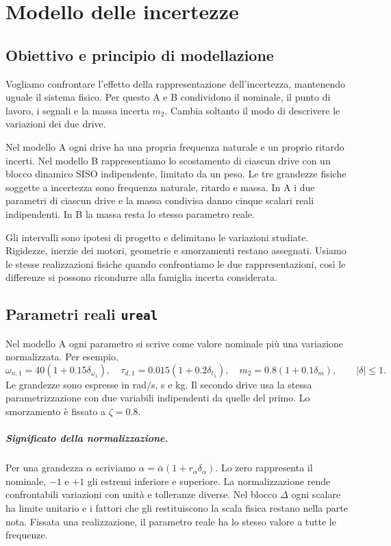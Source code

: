 \chapter{Modello delle incertezze}
\section{Obiettivo e principio di modellazione}
Vogliamo confrontare l'effetto della rappresentazione dell'incertezza, mantenendo uguale il sistema fisico. Per questo A e B condividono il nominale, il punto di lavoro, i segnali e la massa incerta $m_2$. Cambia soltanto il modo di descrivere le variazioni dei due drive.

Nel modello A ogni drive ha una propria frequenza naturale e un
proprio ritardo incerti. Nel modello B rappresentiamo lo scostamento
di ciascun drive con un blocco dinamico SISO indipendente, limitato da
un peso. Le tre grandezze fisiche soggette a incertezza sono frequenza
naturale, ritardo e massa. In A i due parametri di ciascun drive
e la massa condivisa danno cinque scalari reali indipendenti.
In B la massa resta lo stesso parametro reale.

Gli intervalli sono ipotesi di progetto e delimitano le variazioni
studiate. Rigidezze, inerzie dei motori, geometrie e smorzamenti
restano assegnati. Usiamo le stesse realizzazioni fisiche quando
confrontiamo le due rappresentazioni, così le differenze si possono
ricondurre alla famiglia incerta considerata.

\section{Parametri reali \texttt{ureal}}
Nel modello A ogni parametro si scrive come valore nominale più una variazione normalizzata. Per esempio,
\[
 \omega_{n,1}=40(1+0.15\delta_{\omega_1}),\quad
 \tau_{d,1}=0.015(1+0.2\delta_{t_1}),\quad
 m_2=0.8(1+0.1\delta_m),\qquad |\delta|\leq1.
\]
Le grandezze sono espresse in rad/s, s e kg. Il secondo drive usa la
stessa parametrizzazione con due variabili indipendenti da quelle
del primo. Lo smorzamento è fissato a $\zeta=0.8$.

\paragraph*{Significato della normalizzazione.}
Per una grandezza $\alpha$ scriviamo
$\alpha=\bar\alpha(1+r_\alpha\delta_\alpha)$.
Lo zero rappresenta il nominale, $-1$ e $+1$ gli estremi inferiore
e superiore. La normalizzazione rende confrontabili variazioni con
unità e tolleranze diverse. Nel blocco $\Delta$ ogni scalare ha
limite unitario e i fattori che gli restituiscono la scala fisica
restano nella parte nota. Fissata una realizzazione, il parametro
reale ha lo stesso valore a tutte le frequenze.

